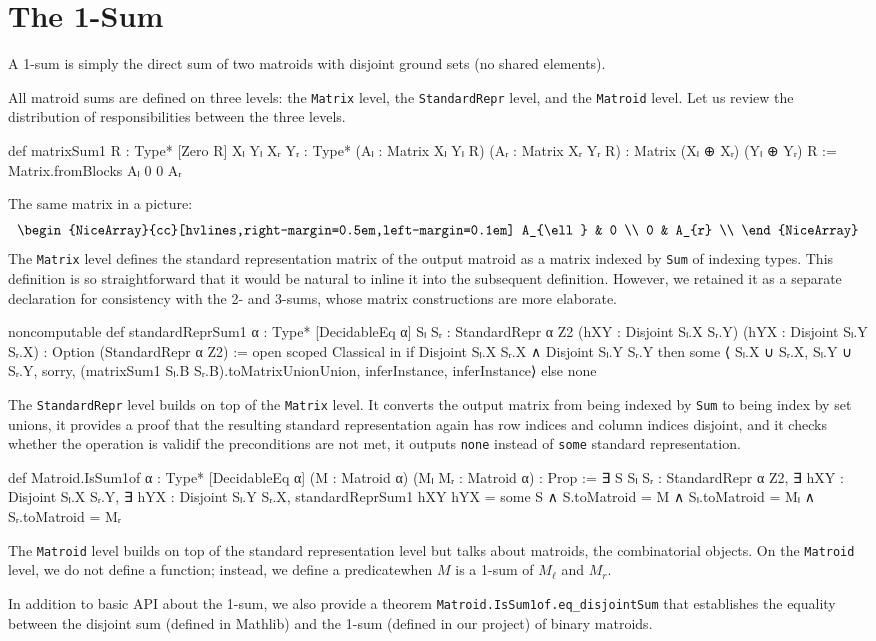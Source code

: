 \section{The 1-Sum}

A 1-sum is simply the direct sum of two matroids with disjoint ground sets (no shared elements).

All matroid sums are defined on three levels: the \texttt{Matrix} level, the \texttt{StandardRepr} level, and the \texttt{Matroid} level. Let us review the distribution of responsibilities between the three levels.
\begin{leancode}
def matrixSum1 {R : Type*} [Zero R]
    {Xₗ Yₗ Xᵣ Yᵣ : Type*}
    (Aₗ : Matrix Xₗ Yₗ R) (Aᵣ : Matrix Xᵣ Yᵣ R) :
    Matrix (Xₗ ⊕ Xᵣ) (Yₗ ⊕ Yᵣ) R :=
  Matrix.fromBlocks Aₗ 0 0 Aᵣ
\end{leancode}
The same matrix in a picture:
\[
    \renewcommand{\arraystretch}{1.4}
    \begin{NiceArray}{cc}[hvlines,right-margin=0.5em,left-margin=0.1em]
        A_{\ell} & 0 \\
        0 & A_{r} \\
    \end{NiceArray}
\]
The \texttt{Matrix} level defines the standard representation matrix of the output matroid as a matrix indexed by \texttt{Sum} of indexing types. This definition is so straightforward that it would be natural to inline it into the subsequent definition. However, we retained it as a separate declaration for consistency with the 2- and 3-sums, whose matrix constructions are more elaborate.
\begin{leancode}
noncomputable def standardReprSum1
    {α : Type*} [DecidableEq α]
    {Sₗ Sᵣ : StandardRepr α Z2}
    (hXY : Disjoint Sₗ.X Sᵣ.Y)
    (hYX : Disjoint Sₗ.Y Sᵣ.X) :
    Option (StandardRepr α Z2) :=
  open scoped Classical in if
    Disjoint Sₗ.X Sᵣ.X ∧ Disjoint Sₗ.Y Sᵣ.Y
  then
    some ⟨
      Sₗ.X ∪ Sᵣ.X,
      Sₗ.Y ∪ Sᵣ.Y,
      sorry,
      (matrixSum1 Sₗ.B Sᵣ.B).toMatrixUnionUnion,
      inferInstance,
      inferInstance⟩
  else
    none
\end{leancode}
The \texttt{StandardRepr} level builds on top of the \texttt{Matrix} level.
It converts the output matrix from being indexed by \texttt{Sum} to
being index by set unions, it provides a proof that the resulting
standard representation again has row indices and column indices disjoint,
and it checks whether the operation is valid\EmDash if the preconditions
are not met, it outputs \texttt{none} instead of \texttt{some} standard representation.
\begin{leancode}
def Matroid.IsSum1of {α : Type*} [DecidableEq α]
    (M : Matroid α) (Mₗ Mᵣ : Matroid α) :
    Prop :=
  ∃ S Sₗ Sᵣ : StandardRepr α Z2,
  ∃ hXY : Disjoint Sₗ.X Sᵣ.Y,
  ∃ hYX : Disjoint Sₗ.Y Sᵣ.X,
  standardReprSum1 hXY hYX = some S
  ∧ S.toMatroid = M
  ∧ Sₗ.toMatroid = Mₗ
  ∧ Sᵣ.toMatroid = Mᵣ
\end{leancode}
The \texttt{Matroid} level builds on top of the standard representation level but
talks about matroids, the combinatorial objects. On the \texttt{Matroid} level, we
do not define a function; instead, we define a predicate\EmDash when $M$ is
a 1-sum of $M_{\ell}$ and $M_{r}$.

In addition to basic API about the 1-sum, we also provide
a theorem \texttt{Matroid.IsSum1of.eq\_disjointSum} that establishes
the equality between the disjoint sum (defined in Mathlib) and
the 1-sum (defined in our project) of binary matroids.
